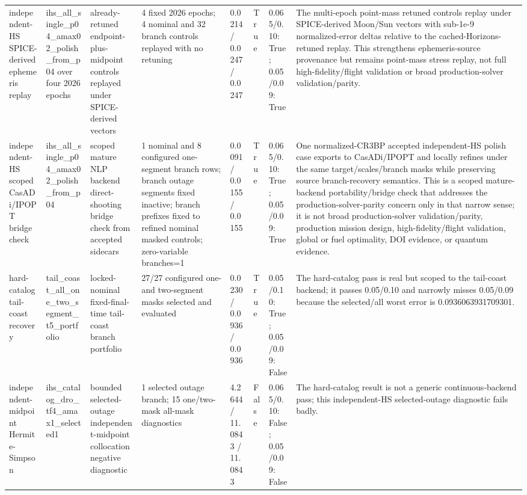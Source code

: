 \begin{tabular}{llllllll}
independent-HS SPICE-derived ephemeris replay & ihs\_all\_single\_p04\_amax02\_polish\_from\_p04 over four 2026 epochs & already-retuned endpoint-plus-midpoint controls replayed under SPICE-derived vectors & 4 fixed 2026 epochs; 4 nominal and 32 branch controls replayed with no retuning & 0.0214 / 0.0247 / 0.0247 & True & 0.065/0.10: True; 0.05/0.09: True & The multi-epoch point-mass retuned controls replay under SPICE-derived Moon/Sun vectors with sub-1e-9 normalized-error deltas relative to the cached-Horizons-retuned replay. This strengthens ephemeris-source provenance but remains point-mass stress replay, not full high-fidelity/flight validation or broad production-solver validation/parity. \\
independent-HS scoped CasADi/IPOPT bridge check & ihs\_all\_single\_p04\_amax02\_polish\_from\_p04 & scoped mature NLP backend direct-shooting bridge check from accepted sidecars & 1 nominal and 8 configured one-segment branch rows; branch outage segments fixed inactive; branch prefixes fixed to refined nominal masked controls; zero-variable branches=1 & 0.0091 / 0.0155 / 0.0155 & True & 0.065/0.10: True; 0.05/0.09: True & One normalized-CR3BP accepted independent-HS polish case exports to CasADi/IPOPT and locally refines under the same target/scales/branch masks while preserving source branch-recovery semantics. This is a scoped mature-backend portability/bridge check that addresses the production-solver-parity concern only in that narrow sense; it is not broad production-solver validation/parity, production mission design, high-fidelity/flight validation, global or fuel optimality, DOI evidence, or quantum evidence. \\
hard-catalog tail-coast recovery & tail\_coast\_all\_one\_two\_segment\_t5\_portfolio & locked-nominal fixed-final-time tail-coast branch portfolio & 27/27 configured one- and two-segment masks selected and evaluated & 0.0230 / 0.0936 / 0.0936 & True & 0.05/0.10: True; 0.05/0.09: False & The hard-catalog pass is real but scoped to the tail-coast backend; it passes 0.05/0.10 and narrowly misses 0.05/0.09 because the selected/all worst error is 0.0936063931709301. \\
independent-midpoint Hermite-Simpson & ihs\_catalog\_dro\_tf4\_amax1\_selected1 & bounded selected-outage independent-midpoint collocation negative diagnostic & 1 selected outage branch; 15 one/two-mask all-mask diagnostics & 4.2644 / 11.0843 / 11.0843 & False & 0.065/0.10: False; 0.05/0.09: False & The hard-catalog result is not a generic continuous-backend pass; this independent-HS selected-outage diagnostic fails badly. \\
\bottomrule
\end{tabular}
